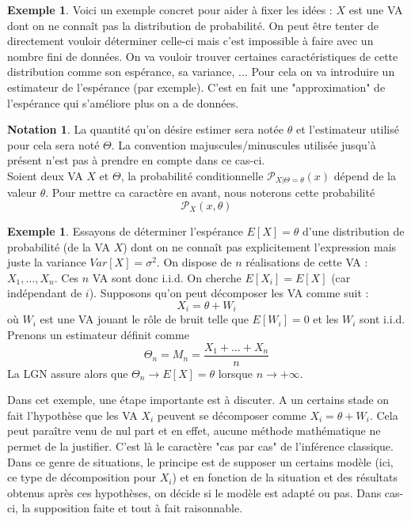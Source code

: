 \documentclass[a4paper,12pt]{report}
\theoremstyle{definition}
\newcommand{\ra}{\rightarrow}
\renewcommand{\(}{\left(}
\renewcommand{\)}{\right)}
\renewcommand{\P}{\mathcal{P}}
\newtheorem{exmp}[thm]{Exemple}
\newtheorem{notat}[thm]{Notation}
\begin{document}
        \begin{exmp}
            Voici un exemple concret pour aider à fixer les idées : $X$ est une VA dont on ne connaît pas la distribution de probabilité. On peut être tenter de directement vouloir déterminer celle-ci mais c'est impossible à faire avec un nombre fini de données. On va vouloir trouver certaines caractéristiques de cette distribution comme son espérance, sa variance, ... Pour cela on va introduire un estimateur de l'espérance (par exemple). C'est en fait une "approximation" de l'espérance qui s'améliore plus on a de données.
        \end{exmp}
        
        \begin{notat}
            La quantité qu'on désire estimer sera notée $\theta$ et l'estimateur utilisé pour cela sera noté $\Theta$. La convention majuscules/minuscules utilisée jusqu'à présent n'est pas à prendre en compte dans ce cas-ci.\\
            Soient deux VA $X$ et $\Theta$, la probabilité conditionnelle $\P_{X|\Theta =\theta}(x)$ dépend de la valeur $\theta$. Pour mettre ca caractère en avant, nous noterons cette probabilité
            $$\P_X(x,\theta)$$
        \end{notat}
        
        \begin{exmp}
            \label{exest}
            Essayons de déterminer l'espérance $E[X]=\theta$ d'une distribution de probabilité (de la VA $X$) dont on ne connaît pas explicitement l'expression mais juste la variance $Var[X]=\sigma^2$. On dispose de $n$ réalisations de cette VA : $X_1,\dots,X_n$. Ces $n$ VA sont donc i.i.d. On cherche $E[X_i]=E[X]$ (car indépendant de $i$). Supposons qu'on peut décomposer les VA comme suit :
            $$X_i = \theta + W_i$$
            où $W_i$ est une VA jouant le rôle de bruit telle que $E[W_i] = 0$ et les $W_i$ sont i.i.d. Prenons un estimateur définit comme
            $$\Theta_n=M_n = \frac{X_1+\dots+X_n}{n}$$
            La LGN assure alors que $\Theta_n\ra E[X] = \theta$ lorsque $n\ra+\infty$.
        \end{exmp}
        
        Dans cet exemple, une étape importante est à discuter. A un certains stade on fait l'hypothèse que les VA $X_i$ peuvent se décomposer comme $X_i=\theta+W_i$. Cela peut paraître venu de nul part et en effet, aucune méthode mathématique ne permet de la justifier. C'est là le caractère "cas par cas" de l'inférence classique. Dans ce genre de situations, le principe est de supposer un certains modèle (ici, ce type de décomposition pour $X_i$) et en fonction de la situation et des résultats obtenus après ces hypothèses, on décide si le modèle est adapté ou pas. Dans cas-ci, la supposition faite et tout à fait raisonnable.
        
\end{document}
